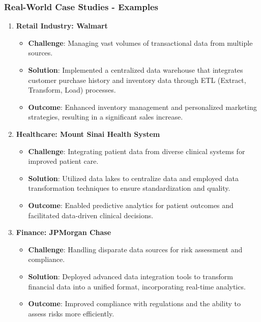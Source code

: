 \documentclass[aspectratio=169]{beamer}
\begin{document}
\begin{frame}[fragile]
    \frametitle{Real-World Case Studies - Examples}
    \begin{enumerate}
        \item \textbf{Retail Industry: Walmart}
            \begin{itemize}
                \item \textbf{Challenge}: Managing vast volumes of transactional data from multiple sources.
                \item \textbf{Solution}: Implemented a centralized data warehouse that integrates customer purchase history and inventory data through ETL (Extract, Transform, Load) processes.
                \item \textbf{Outcome}: Enhanced inventory management and personalized marketing strategies, resulting in a significant sales increase.
            \end{itemize}
        
        \item \textbf{Healthcare: Mount Sinai Health System}
            \begin{itemize}
                \item \textbf{Challenge}: Integrating patient data from diverse clinical systems for improved patient care.
                \item \textbf{Solution}: Utilized data lakes to centralize data and employed data transformation techniques to ensure standardization and quality.
                \item \textbf{Outcome}: Enabled predictive analytics for patient outcomes and facilitated data-driven clinical decisions.
            \end{itemize}
        
        \item \textbf{Finance: JPMorgan Chase}
            \begin{itemize}
                \item \textbf{Challenge}: Handling disparate data sources for risk assessment and compliance.
                \item \textbf{Solution}: Deployed advanced data integration tools to transform financial data into a unified format, incorporating real-time analytics.
                \item \textbf{Outcome}: Improved compliance with regulations and the ability to assess risks more efficiently.
            \end{itemize}
    \end{enumerate}
\end{frame}
\end{document}
